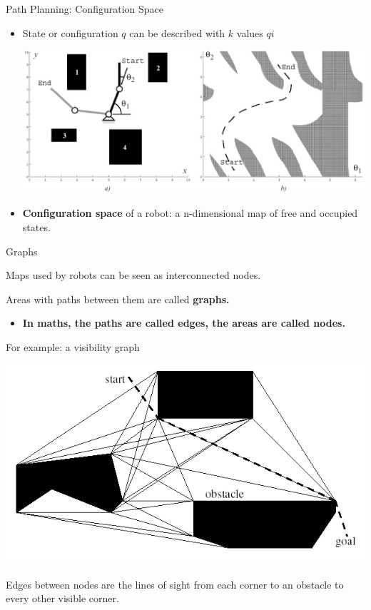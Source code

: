 \documentclass[compress]{beamer}
\begin{document}
\begin{frame}{Path Planning: Configuration Space}

\begin{itemize}
\item State or configuration $q$ can be described with $k$ values
  $qi$

    \begin{center}
        \includegraphics[width=0.6\linewidth]{configurationspace}
    \end{center}

\item \textbf{Configuration space} of a robot: a n-dimensional map of free
  and occupied states.
\end{itemize}

\end{frame}

\begin{frame}{Graphs}

Maps used by robots can be seen as interconnected nodes.

Areas with paths between them are called \textbf{graphs.}

\begin{itemize}
\item \textbf{In maths, the paths are called edges, the areas are called
  nodes.}
\end{itemize}

For example: a visibility graph

    \begin{center}
        \includegraphics[width=0.6\linewidth]{visibilitygraph}
    \end{center}

Edges between nodes are the lines of sight from each corner to an
obstacle to every other visible corner.

\end{frame}
\end{document}
